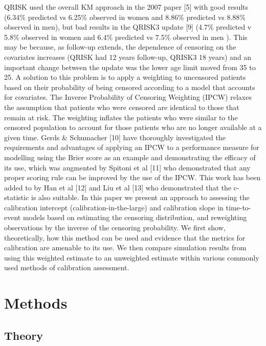 \documentclass[12pt,twoside]{reedthesis}
\begin{document}
QRISK used the overall KM approach in the 2007 paper {[}5{]} with good results (6.34\% predicted vs 6.25\% observed in women and 8.86\% predicted vs 8.88\% observed in men), but bad results in the QRISK3 update {[}9{]} (4.7\% predicted v 5.8\% observed in women and 6.4\% predicted vs 7.5\% observed in men ). This may be because, as follow-up extends, the dependence of censoring on the covariates increases (QRISK had 12 years follow-up, QRISK3 18 years) and an important change between the update was the lower age limit moved from 35 to 25.
A solution to this problem is to apply a weighting to uncensored patients based on their probability of being censored according to a model that accounts for covariates. The Inverse Probability of Censoring Weighting (IPCW) relaxes the assumption that patients who were censored are identical to those that remain at risk. The weighting inflates the patients who were similar to the censored population to account for those patients who are no longer available at a given time.
Gerds \& Schumacher {[}10{]} have thoroughly investigated the requirements and advantages of applying an IPCW to a performance measure for modelling using the Brier score as an example and demonstrating the efficacy of its use, which was augmented by Spitoni et al {[}11{]} who demonstrated that any proper scoring rule can be improved by the use of the IPCW. This work has been added to by Han et al {[}12{]} and Liu et al {[}13{]} who demonstrated that the c-statistic is also suitable.
In this paper we present an approach to assessing the calibration intercept (calibration-in-the-large) and calibration slope in time-to-event models based on estimating the censoring distribution, and reweighting observations by the inverse of the censoring probability. We first show, theoretically, how this method can be used and evidence that the metrics for calibration are amenable to its use. We then compare simulation results from using this weighted estimate to an unweighted estimate within various commonly used methods of calibration assessment.

\hypertarget{methods-2}{%
\section{Methods}\label{methods-2}}

\hypertarget{theory}{%
\subsection{Theory}\label{theory}}
\end{document}
